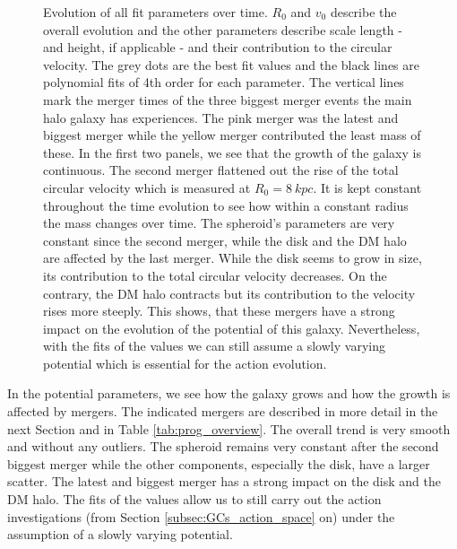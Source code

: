 \begin{figure}
\caption{Evolution of all fit parameters over time. $R_0$ and $v_0$ describe the overall evolution and the other parameters describe scale length - and height, if applicable - and their contribution to the circular velocity. The grey dots are the best fit values and the black lines are polynomial fits of 4th order for each parameter. The vertical lines mark the merger times of the three biggest merger events the main halo galaxy has experiences. The pink merger was the latest and biggest merger while the yellow merger contributed the least mass of these. In the first two panels, we see that the growth of the galaxy is continuous. The second merger flattened out the rise of the total circular velocity which is measured at $R_0 = \SI{8}{kpc}$. It is kept constant throughout the time evolution to see how within a constant radius the mass changes over time. The spheroid's parameters are very constant since the second merger, while the disk and the \ac{DM} halo are affected by the last merger. While the disk seems to grow in size, its contribution to the total circular velocity decreases. On the contrary, the \ac{DM} halo contracts but its contribution to the velocity rises more steeply. This shows, that these mergers have a strong impact on the evolution of the potential of this galaxy. Nevertheless, with the fits of the values we can still assume a slowly varying potential which is essential for the action evolution.}\label{fig:pot_val_evol}
\end{figure}
In the potential parameters, we see how the galaxy grows and how the growth is affected by mergers. The indicated mergers are described in more detail in the next Section and in Table \ref{tab:prog_overview}. The overall trend is very smooth and without any outliers. The spheroid remains very constant after the second biggest merger while the other components, especially the disk, have a larger scatter. The latest and biggest merger has a strong impact on the disk and the \ac{DM} halo. The fits of the values allow us to still carry out the action investigations (from Section \ref{subsec:GCs_action_space} on) under the assumption of a slowly varying potential. 


